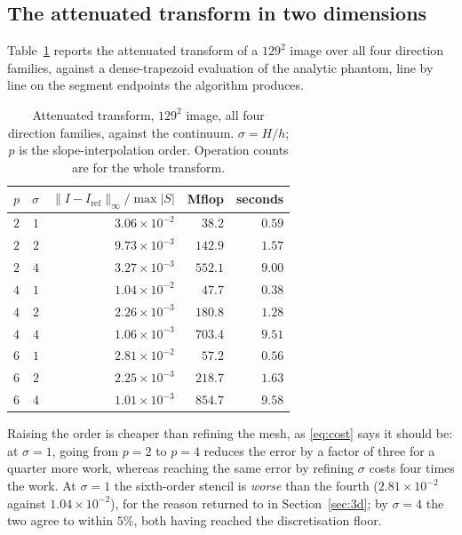 \documentclass[11pt]{article}
\begin{document}
\subsection{The attenuated transform in two dimensions}

Table~\ref{tab:spect2d} reports the attenuated transform of a $129^2$ image over
all four direction families, against a dense-trapezoid evaluation of the
analytic phantom, line by line on the segment endpoints the algorithm produces.

\begin{table}[t]
\centering\small
\caption{Attenuated transform, $129^2$ image, all four direction families,
against the continuum. $\sigma = H/h$; $p$ is the slope-interpolation order.
Operation counts are for the whole transform.}
\label{tab:spect2d}
\begin{tabular}{rr rrr}
\toprule
$p$ & $\sigma$ & $\|I - I_{\mathrm{ref}}\|_\infty / \max|S|$ & Mflop & seconds\\
\midrule
$2$ & $1$ & $3.06\!\times\!10^{-2}$ & $38.2$ & $0.59$\\
$2$ & $2$ & $9.73\!\times\!10^{-3}$ & $142.9$ & $1.57$\\
$2$ & $4$ & $3.27\!\times\!10^{-3}$ & $552.1$ & $9.00$\\
\addlinespace
$4$ & $1$ & $1.04\!\times\!10^{-2}$ & $47.7$ & $0.38$\\
$4$ & $2$ & $2.26\!\times\!10^{-3}$ & $180.8$ & $1.28$\\
$4$ & $4$ & $1.06\!\times\!10^{-3}$ & $703.4$ & $9.51$\\
\addlinespace
$6$ & $1$ & $2.81\!\times\!10^{-2}$ & $57.2$ & $0.56$\\
$6$ & $2$ & $2.25\!\times\!10^{-3}$ & $218.7$ & $1.63$\\
$6$ & $4$ & $1.01\!\times\!10^{-3}$ & $854.7$ & $9.58$\\
\bottomrule
\end{tabular}
\end{table}

Raising the order is cheaper than refining the mesh, as \eqref{eq:cost} says it
should be: at $\sigma = 1$, going from $p=2$ to $p=4$ reduces the error by a
factor of three for a quarter more work, whereas reaching the same error by
refining $\sigma$ costs four times the work.  At $\sigma = 1$ the sixth-order
stencil is \emph{worse} than the fourth ($2.81\times10^{-2}$ against
$1.04\times10^{-2}$), for the reason returned to in Section~\ref{sec:3d}; by
$\sigma = 4$ the two agree to within $5\%$, both having reached the
discretisation floor.
\end{document}
